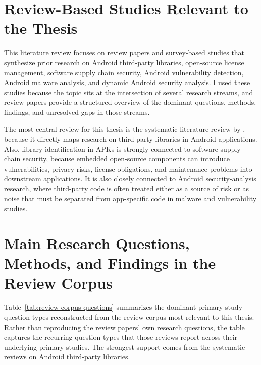 \documentclass[12pt,a4paper]{report}
\begin{document}
\section{Review-Based Studies Relevant to the Thesis}
This literature review focuses on review papers and survey-based studies that synthesize prior research on Android third-party libraries, open-source license management, software supply chain security, Android vulnerability detection, Android malware analysis, and dynamic Android security analysis. I used these studies because the topic sits at the intersection of several research streams, and review papers provide a structured overview of the dominant questions, methods, findings, and unresolved gaps in those streams.

The most central review for this thesis is the systematic literature review by \textcite{zhanResearchThirdPartyLibraries2022}, because it directly maps research on third-party libraries in Android applications. Also, library identification in APKs is strongly connected to software supply chain security, because embedded open-source components can introduce vulnerabilities, privacy risks, license obligations, and maintenance problems into downstream applications. It is also closely connected to Android security-analysis research, where third-party code is often treated either as a source of risk or as noise that must be separated from app-specific code in malware and vulnerability studies.

\section{Main Research Questions, Methods, and Findings in the Review Corpus}
Table~\ref{tab:review-corpus-questions} summarizes the dominant primary-study question types reconstructed from the review corpus most relevant to this thesis. Rather than reproducing the review papers' own research questions, the table captures the recurring question types that those reviews report across their underlying primary studies. The strongest support comes from the systematic reviews on Android third-party libraries.
\end{document}
